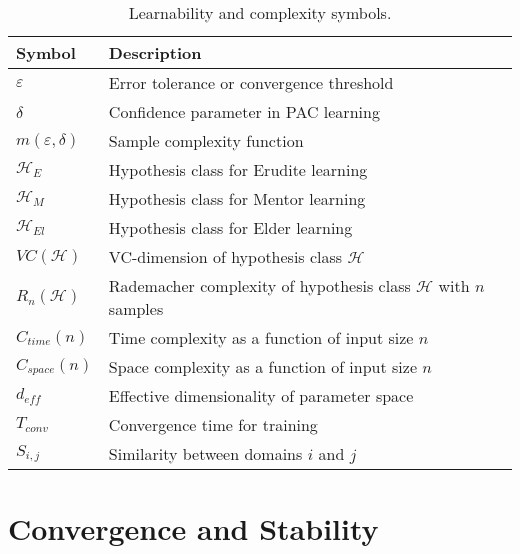 \begin{table}[h]
\centering
\begin{tabular}{|l|p{10cm}|}
\hline
\textbf{Symbol} & \textbf{Description} \\
\hline
$\varepsilon$ & Error tolerance or convergence threshold \\
\hline
$\delta$ & Confidence parameter in PAC learning \\
\hline
$m(\varepsilon, \delta)$ & Sample complexity function \\
\hline
$\mathcal{H}_{E}$ & Hypothesis class for Erudite learning \\
\hline
$\mathcal{H}_{M}$ & Hypothesis class for Mentor learning \\
\hline
$\mathcal{H}_{El}$ & Hypothesis class for Elder learning \\
\hline
$VC(\mathcal{H})$ & VC-dimension of hypothesis class $\mathcal{H}$ \\
\hline
$R_n(\mathcal{H})$ & Rademacher complexity of hypothesis class $\mathcal{H}$ with $n$ samples \\
\hline
$C_{time}(n)$ & Time complexity as a function of input size $n$ \\
\hline
$C_{space}(n)$ & Space complexity as a function of input size $n$ \\
\hline
$d_{eff}$ & Effective dimensionality of parameter space \\
\hline
$T_{conv}$ & Convergence time for training \\
\hline
$S_{i,j}$ & Similarity between domains $i$ and $j$ \\
\hline
\end{tabular}
\caption{Learnability and complexity symbols.}
\label{tab:symbols_learnability}
\end{table}

\section{Convergence and Stability}

